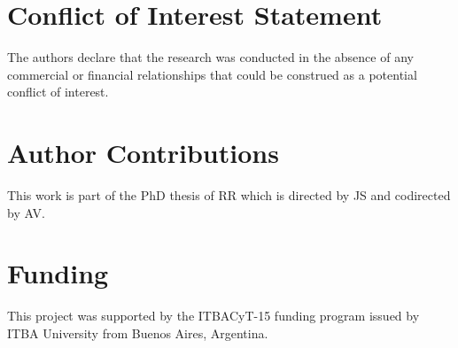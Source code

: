 \documentclass[utf8]{frontiersSCNS} %
\begin{document}
\section*{Conflict of Interest Statement}
The authors declare that the research was conducted in the absence of any commercial or financial relationships that could be construed as a potential conflict of interest.

\section*{Author Contributions}

This work is part of the PhD thesis of RR which is directed by JS and codirected by AV.   

\section*{Funding}
This project was supported by the ITBACyT-15 funding program issued by ITBA University from Buenos Aires, Argentina.






%
%
\end{document}
